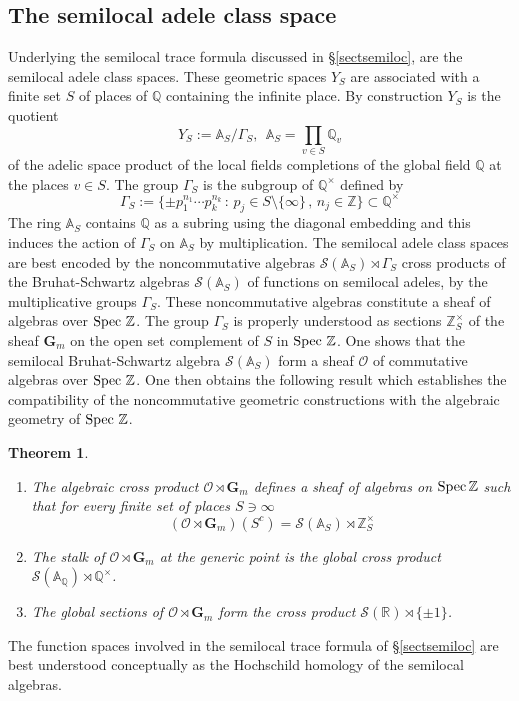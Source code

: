 \documentclass{article}
\newtheorem{thm}{Theorem}[section]
\def\cS{\mathcal{S}}
\def\sheaf{{\mathscr{O} }}
\def\A{{\mathbb A}}
\def\Q{{\mathbb Q}}
\def\R{{\mathbb R}}
\def\Z{{\mathbb Z}}
\def\cS{{\mathcal S}}
\def\Spec{{\rm Spec\,}}
\begin{document}
\subsection{The semilocal adele class space}
Underlying the semilocal trace formula discussed in \S \ref{sectsemiloc}, are the semilocal adele class spaces.
These geometric spaces $Y_S$ are associated with a finite set $S$ of places of $\Q$ containing the infinite place. By construction $Y_S$ is the quotient
\begin{equation}\label{YQS}
Y_{S}:=\A_{S}/\Gamma_S,\ \  \A_{S}=\prod_{v\in S} \Q_v
\end{equation} 
of the adelic space 
 		 		 product of the local fields completions of the global field $\Q$ at the places $v\in S$. The group $\Gamma_S$ is the subgroup of $\Q^\times$ defined by  
 \begin{equation}\label{GL1QS}
\Gamma_S:= \{ \pm p_1^{n_1} \cdots p_k^{n_k} \, :\,  p_j
\in S \setminus\{ \infty \} \,,\, n_j\in \Z\}\subset \Q^\times
\end{equation}
The ring $ \A_{S}$ contains $\Q$ as a subring using the diagonal embedding and this induces the action of $\Gamma_S$ on $ \A_{S}$ by multiplication. The  semilocal adele class spaces are best encoded by the noncommutative algebras $\cS(\A_S)\rtimes \Gamma_S$ cross products of the Bruhat-Schwartz algebras $\cS(\A_S)$ of functions on semilocal adeles, by the multiplicative groups $\Gamma_S$.  These noncommutative algebras constitute a sheaf of algebras over $\Spec\,\Z$. The group $ \Gamma_S$ is properly understood as sections $\Z_S^\times$ of the sheaf $\mathbf{G}_m$ on the open set complement of $S$ in $\Spec\,\Z$. One shows that the semilocal Bruhat-Schwartz algebra $\cS(\A_S)$ form a sheaf $\sheaf$ of commutative algebras over $\Spec\,\Z$. One then obtains the following result which establishes the compatibility of the noncommutative geometric constructions with the algebraic geometry of $\Spec\,\Z$. 
\begin{thm}	
\label{structure1intro}  
 		\begin{enumerate}
 			\item The algebraic cross product $\sheaf\rtimes \mathbf{G}_m$ defines a sheaf  of algebras on  $\Spec\Z$ such that for every finite set of places $S\ni \infty$
 			$$
 			\left(\sheaf\rtimes \mathbf{G}_m\right)(S^c)=\cS(\A_S)\rtimes \Z_S^\times 			$$
 			\item The stalk of $\sheaf\rtimes \mathbf{G}_m$ at the generic point  is the global cross product $\cS(\A_\Q)\rtimes \Q^\times$. 			\item The global sections of $\sheaf\rtimes \mathbf{G}_m$ form the cross product $\cS(\R)\rtimes \{\pm 1\}$.
 		\end{enumerate}
\end{thm}
The function spaces involved in the semilocal trace formula of \S \ref{sectsemiloc} are best understood conceptually as the Hochschild homology of the semilocal algebras.
\end{document}
